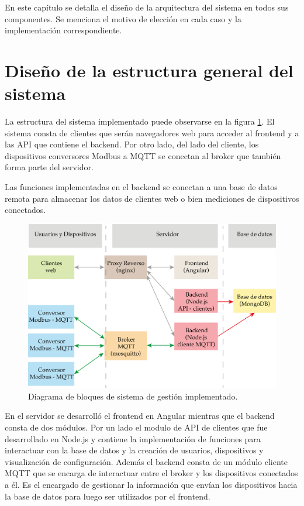 En este capítulo se detalla el diseño de la arquitectura del sistema en todos sus componentes. Se menciona el motivo de elección en cada caso y la implementación correspondiente.

\section{Diseño de la estructura general del sistema}
\label{seccion-intro}
La estructura del sistema implementado puede observarse en la figura \ref{fig:esquema-general}. El sistema consta de clientes que serán navegadores web para acceder al frontend y a las API \citep{WEBSITE:34} que contiene el backend. Por otro lado, del lado del cliente, los dispositivos conversores Modbus a MQTT se conectan al broker que también forma parte del servidor.

Las funciones implementadas en el backend se conectan a una base de datos remota para almacenar los datos de clientes web o bien mediciones de dispositivos conectados.

\begin{figure}[htpb]
	\centering
	\includegraphics[scale=.75]{./Figures/esquema-general.png}
	\caption[Diagrama de bloques de sistema implementado ]{Diagrama de bloques de sistema de gestión implementado.}
	\label{fig:esquema-general}
\end{figure}
 
En el servidor se desarrolló el frontend en Angular mientras que el backend consta de dos módulos. Por un lado el modulo de API de clientes que fue desarrollado en Node.js y contiene la implementación de funciones para interactuar con la base de datos y la creación de usuarios, dispositivos y visualización de configuración.  Además el backend consta de un módulo cliente MQTT que se encarga de interactuar entre el broker y los dispositivos conectados a él. Es el encargado de gestionar la información que envían los dispositivos hacia la base de datos para luego ser utilizados por el frontend. 


